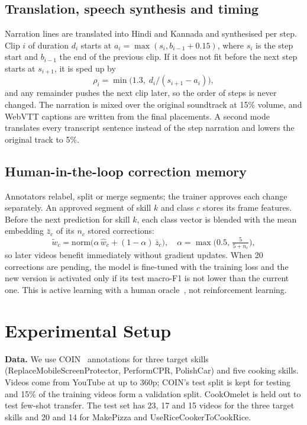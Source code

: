 \documentclass[conference]{IEEEtran}
\begin{document}
\subsection{Translation, speech synthesis and timing}
Narration lines are translated into Hindi and Kannada and synthesised per step. Clip $i$ of duration $d_i$ starts at
$a_i = \max(s_i, b_{i-1}+0.15)$, where $s_i$ is the step start and $b_{i-1}$ the end of the previous clip. If it does not
fit before the next step starts at $s_{i+1}$, it is sped up by
\begin{equation}
\rho_i = \min\!\big(1.3,\; d_i/(s_{i+1}-a_i)\big),
\end{equation}
and any remainder pushes the next clip later, so the order of steps is never changed. The narration is mixed over the
original soundtrack at 15\% volume, and WebVTT captions are written from the final placements. A second mode translates
every transcript sentence instead of the step narration and lowers the original track to 5\%.

\subsection{Human-in-the-loop correction memory}
Annotators relabel, split or merge segments; the trainer approves each change separately. An approved segment of skill
$k$ and class $c$ stores its frame features. Before the next prediction for skill $k$, each class vector is blended with
the mean embedding $\bar z_c$ of its $n_c$ stored corrections:
\begin{equation}
\tilde w_c = \mathrm{norm}\big(\alpha\,\hat w_c + (1-\alpha)\,\bar z_c\big),\quad \alpha = \max\!\big(0.5,\, \tfrac{5}{5+n_c}\big),
\end{equation}
so later videos benefit immediately without gradient updates. When 20 corrections are pending, the model is fine-tuned
with the training loss and the new version is activated only if its test macro-F1 is not lower than the current one.
This is active learning with a human oracle~\cite{settles2009active}, not reinforcement learning.

\section{Experimental Setup}
\textbf{Data.} We use COIN~\cite{tang2019coin} annotations for three target skills (ReplaceMobileScreenProtector,
PerformCPR, PolishCar) and five cooking skills. Videos come from YouTube at up to 360p; COIN's test split is kept for
testing and 15\% of the training videos form a validation split. CookOmelet is held out to test few-shot transfer.
The test set has 23, 17 and 15 videos for the three target skills and 20 and 14 for MakePizza and
UseRiceCookerToCookRice.
\end{document}
